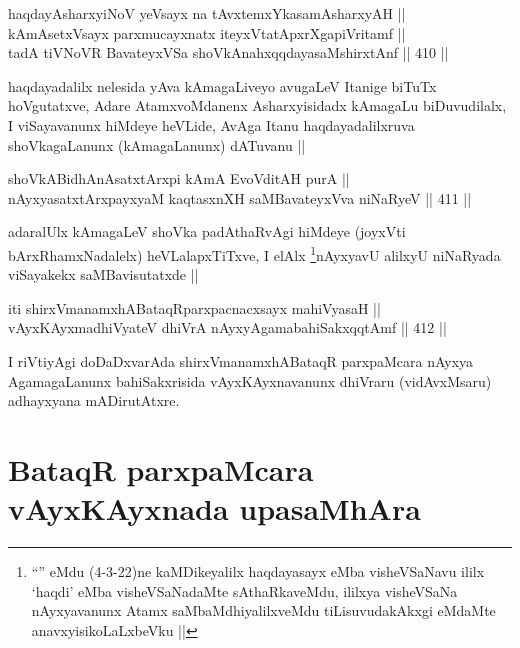 \begin{shl}
haqdayAsharxyiNoV yeV\s sayx na tAvxtemxYkasamAsharxyAH || \\
kAmAsetxV\s sayx parxmucayxnatx iteyxVtatApxrXgapiVritamf || \\
tadA tiVNoVR BavateyxVSa shoVkAnahxqqdayasaMshirxtAnf ||  410 ||  
\end{shl}

\begin{artha}
haqdayadalilx nelesida yAva kAmagaLiveyo avugaLeV Itanige biTuTx
hoVgutatxve, Adare AtamxvoMdanenx Asharxyisidadx kAmagaLu
biDuvudilalx, I viSayavanunx hiMdeye heVLide, AvAga Itanu
haqdayadalilxruva shoVkagaLanunx (kAmagaLanunx) dATuvanu ||
\end{artha}


\begin{shl}
shoVkABidhAnAsatxtArxpi kAmA EvoVditAH purA || \\
nAyxyasatxtArxpayxyaM kaqtasxnXH saMBavateyxVva niNaRyeV ||  411 ||  
\end{shl}

\begin{artha}
adaralUlx kAmagaLeV shoVka padAthaRvAgi hiMdeye (joyxVti
bArxRhamxNadalelx) heVLalapxTiTxve, I elAlx \footnote{``\stext'' eMdu
  (4-3-22)ne kaMDikeyalilx haqdayasayx eMba visheVSaNavu ililx `haqdi'
  eMba visheVSaNadaMte sAthaRkaveMdu, ililxya visheVSaNa nAyxyavanunx
  Atamx saMbaMdhiyalilxveMdu tiLisuvudakAkxgi eMdaMte
  anavxyisikoLaLxbeVku ||}nAyxyavU alilxyU niNaRyada viSayakekx saMBavisutatxde ||
\end{artha}

\begin{shl}
iti shirxVmanamxhABataqRparxpacnacxsayx mahiVyasaH || \\
vAyxKAyxmadhiVyateV dhiVrA nAyxyAgamabahiSakxqqtAmf ||  412 ||  
\end{shl}	

\begin{artha}
I riVtiyAgi doDaDxvarAda shirxVmanamxhABataqR parxpaMcara nAyxya
AgamagaLanunx bahiSakxrisida vAyxKAyxnavanunx dhiVraru (vidAvxMsaru)
adhayxyana mADirutAtxre.
\end{artha}

\section*{BataqR parxpaMcara vAyxKAyxnada upasaMhAra}

